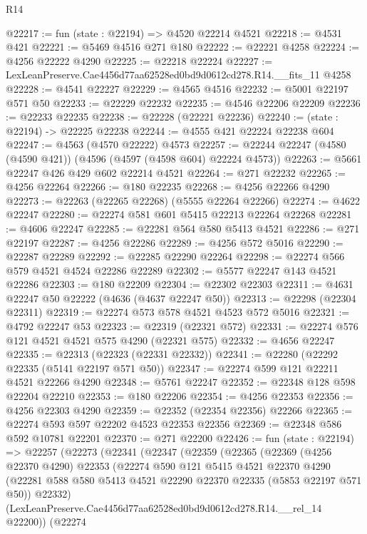 \begin{lexlean}{R14}
\begin{coremodule}
@22217 := fun (state : @22194) => @4520 @22214 @4521
@22218 := @4531 @421
@22221 := @5469 @4516 @271 @180
@22222 := @22221 @4258
@22224 := @4256 @22222 @4290
@22225 := @22218 @22224
@22227 := LexLeanPreserve.Cae4456d77aa62528ed0bd9d0612cd278.R14.__fits_11 @4258
@22228 := @4541 @22227
@22229 := @4565 @4516
@22232 := @5001 @22197 @571 @50
@22233 := @22229 @22232
@22235 := @4546 @22206 @22209
@22236 := @22233 @22235
@22238 := @22228 (@22221 @22236)
@22240 := (state : @22194) -> @22225 @22238
@22244 := @4555 @421 @22224 @22238 @604
@22247 := @4563 (@4570 @22222) @4573
@22257 := @22244 @22247 (@4580 (@4590 @421)) (@4596 (@4597 (@4598 @604) @22224 @4573))
@22263 := @5661 @22247 @426 @429 @602 @22214 @4521
@22264 := @271 @22232
@22265 := @4256 @22264
@22266 := @180 @22235
@22268 := @4256 @22266 @4290
@22273 := @22263 (@22265 @22268) (@5555 @22264 @22266)
@22274 := @4622 @22247
@22280 := @22274 @581 @601 @5415 @22213 @22264 @22268
@22281 := @4606 @22247
@22285 := @22281 @564 @580 @5413 @4521
@22286 := @271 @22197
@22287 := @4256 @22286
@22289 := @4256 @572 @5016
@22290 := @22287 @22289
@22292 := @22285 @22290 @22264
@22298 := @22274 @566 @579 @4521 @4524 @22286 @22289
@22302 := @5577 @22247 @143 @4521 @22286
@22303 := @180 @22209
@22304 := @22302 @22303
@22311 := @4631 @22247 @50 @22222 (@4636 (@4637 @22247 @50))
@22313 := @22298 (@22304 @22311)
@22319 := @22274 @573 @578 @4521 @4523 @572 @5016
@22321 := @4792 @22247 @53
@22323 := @22319 (@22321 @572)
@22331 := @22274 @576 @121 @4521 @4521 @575 @4290 (@22321 @575)
@22332 := @4656 @22247
@22335 := @22313 (@22323 (@22331 @22332))
@22341 := @22280 (@22292 @22335 (@5141 @22197 @571 @50))
@22347 := @22274 @599 @121 @22211 @4521 @22266 @4290
@22348 := @5761 @22247
@22352 := @22348 @128 @598 @22204 @22210
@22353 := @180 @22206
@22354 := @4256 @22353
@22356 := @4256 @22303 @4290
@22359 := @22352 (@22354 @22356) @22266
@22365 := @22274 @593 @597 @22202 @4523 @22353 @22356
@22369 := @22348 @586 @592 @10781 @22201
@22370 := @271 @22200
@22426 := fun (state : @22194) =>
  @22257
    (@22273
      (@22341
        (@22347
          (@22359
            (@22365
              (@22369
                (@4256 @22370 @4290)
                @22353
                (@22274
                  @590
                  @121
                  @5415
                  @4521
                  @22370
                  @4290
                  (@22281 @588 @580 @5413 @4521 @22290 @22370 @22335 (@5853 @22197 @571 @50))
                  @22332)
                (LexLeanPreserve.Cae4456d77aa62528ed0bd9d0612cd278.R14.__rel_14 @22200))
              (@22274

\end{coremodule}
\end{lexlean}
